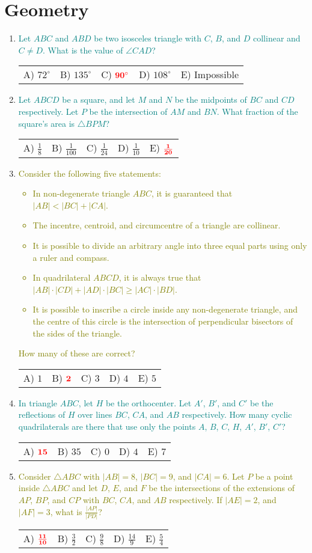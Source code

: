 \documentclass{article}
\newcommand{\answers}[5]{
    \newline
    {
        \centering
        \begin{tabular}{*{5}{p{0.15\textwidth}}}
            A) #1 & B) #2 & C) #3 & D) #4 & E) #5
        \end{tabular}
    }
}
\newcommand{\correct}[1]{
    \mathbf{\textcolor{red}{#1}}
}
\newcommand{\mustintermediate}[1]{
    \textcolor{teal}{#1}
}
\newcommand{\canadvanced}[1]{
    \textcolor{olive}{#1}
}
\begin{document}
\section{Geometry}
\begin{enumerate}[1.]

\item %
\mustintermediate{Let $ABC$ and $ABD$ be two isosceles triangle with $C$, $B$, and $D$ collinear and $C \ne D$.
What is the value of $\angle CAD$?}
\answers{$72^\circ$}{$135^\circ$}{$\correct{90^\circ}$}{$108^\circ$}{Impossible}


\item %
\mustintermediate{Let $ABCD$ be a square, and let $M$ and $N$ be the midpoints of $BC$ and $CD$ respectively.
Let $P$ be the intersection of $AM$ and $BN$.
What fraction of the square's area is $\triangle BPM$?}
\answers{ $\frac{1}{8}$ }{ $\frac{1}{100}$ }{ $\frac{1}{24}$ }{ $\frac{1}{10}$ }{ $\correct{\frac{1}{20}}$ }


\item %
\canadvanced{Consider the following five statements:
\begin{itemize}
  \item In non-degenerate triangle $ABC$, it is guaranteed that $|AB| < |BC| + |CA|$.
  \item The incentre, centroid, and circumcentre of a triangle are collinear.
  \item It is possible to divide an arbitrary angle into three equal parts using only a ruler and compass.
  \item In quadrilateral $ABCD$, it is always true that $|AB| \cdot |CD| + |AD| \cdot |BC| \ge |AC| \cdot |BD|$.
  \item It is possible to inscribe a circle inside any non-degenerate triangle, and the centre of this circle is the intersection of perpendicular bisectors of the sides of the triangle.
\end{itemize}
How many of these are correct?}
\answers{$1$}{$\correct{2}$}{$3$}{$4$}{$5$}

\item %
\mustintermediate{In triangle $ABC$, let $H$ be the orthocenter.
Let $A'$, $B'$, and $C'$ be the reflections of $H$ over lines $BC$, $CA$, and $AB$ respectively.
How many cyclic quadrilaterals are there that use only the points $A$, $B$, $C$, $H$, $A'$, $B'$, $C'$?}
\answers{$\correct{15}$}{$35$}{$0$}{$4$}{$7$}


\item %
\canadvanced{Consider $\triangle ABC$ with $|AB| = 8$, $|BC| = 9$, and $|CA| = 6$.
Let $P$ be a point inside $\triangle ABC$ and let $D$, $E$, and $F$ be the intersections of the extensions of $AP$, $BP$, and $CP$ with $BC$, $CA$, and $AB$ respectively.
If $|AE| = 2$, and $|AF| = 3$, what is $\frac{|AP|}{|PD|}$?}
\answers{ $\correct{\frac{11}{10}}$ }{ $\frac{3}{2}$ }{ $\frac{9}{8}$ }{ $\frac{14}{9}$ }{ $\frac{5}{4}$ }

\end{enumerate}
\end{document}
